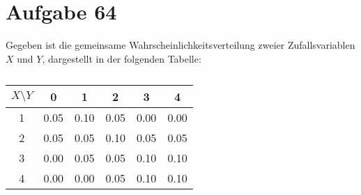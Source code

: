 \setcounter{section}{63}
\section{Aufgabe 64}
\setcounter{section}{64}
\label{sec:aufgabe-64}

Gegeben ist die gemeinsame Wahrscheinlichkeitsverteilung zweier
Zufallsvariablen $X$ und $Y$, dargestellt in der folgenden Tabelle:
\begin{table}[h]
    \centering
    \renewcommand{\arraystretch}{1.5}
    \begin{tabular}{c|c|c|c|c|c}
        $X \setminus Y$ & 0    & 1    & 2    & 3    & 4    \\ \hline
        1               & 0.05 & 0.10 & 0.05 & 0.00 & 0.00 \\
        2               & 0.05 & 0.05 & 0.10 & 0.05 & 0.05 \\
        3               & 0.00 & 0.05 & 0.05 & 0.10 & 0.10 \\
        4               & 0.00 & 0.00 & 0.05 & 0.10 & 0.10
    \end{tabular}
    \caption{}
\end{table}
